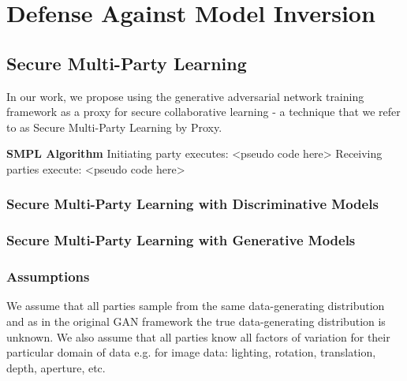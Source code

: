 \chapter{Defense Against Model Inversion}
\label{chapter:body}
\thispagestyle{myheadings}

\graphicspath{{2_Body/Figures/}}

\section{Secure Multi-Party Learning}

In our work, we propose using the generative adversarial network training framework as a proxy for secure collaborative learning - a technique that we refer to as Secure Multi-Party Learning by Proxy. 


\textbf{SMPL Algorithm}
Initiating party executes:
<pseudo code here>
Receiving parties execute:
<pseudo code here>

\subsection{Secure Multi-Party Learning with Discriminative Models}

\subsection{Secure Multi-Party Learning with Generative Models}

\subsection{Assumptions}
We assume that all parties sample from the same data-generating distribution and as in the original GAN framework the true data-generating distribution is unknown. We also assume that all parties know all factors of variation for their particular domain of data e.g. for image data: lighting, rotation, translation, depth, aperture, etc.

